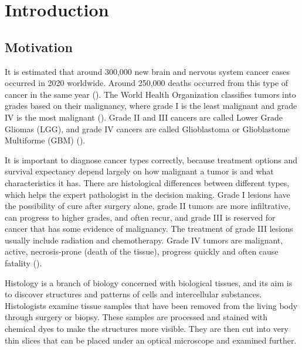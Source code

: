 

\chapter{Introduction}
\label{cha:introduction}

\section{Motivation}
\label{sec:motivation}


It is estimated that around 300,000 new brain and nervous system cancer cases occurred in 2020 worldwide. Around 250,000 deaths occurred from this type of cancer in the same year (\cite{cancer_stats2020}). The World Health Organization classifies tumors into grades based on their malignancy, where grade I is the least malignant and grade IV is the most malignant (\cite{louis}). Grade II and III cancers are called Lower Grade Gliomas (LGG), and grade IV cancers are called Glioblastoma or Glioblastome Multiforme (GBM) (\cite{ostrom}).

It is important to diagnose cancer types correctly, because treatment options and survival expectancy depend largely on how malignant a tumor is and what characteristics it has. There are histological differences between different types, which helps the expert pathologist in the decision making. Grade I lesions have the possibility of cure after surgery alone, grade II tumors are more infiltrative, can progress to higher grades, and often recur, and grade III is reserved for cancer that has some evidence of malignancy. The treatment of grade III lesions usually include radiation and chemotherapy. Grade IV tumors are malignant, active, necrosis-prone (death of the tissue), progress quickly and often cause fatality (\cite{cancer_grades2007}).

Histology is a branch of biology concerned with biological tissues, and its aim is to discover structures and patterns of cells and intercellular substances. Histologists examine tissue samples that have been removed from the living body through surgery or biopsy. These samples are processed and stained with chemical dyes to make the structures more visible. They are then cut into very thin slices that can be placed under an optical microscope and examined further.  \cite{histology_def}

